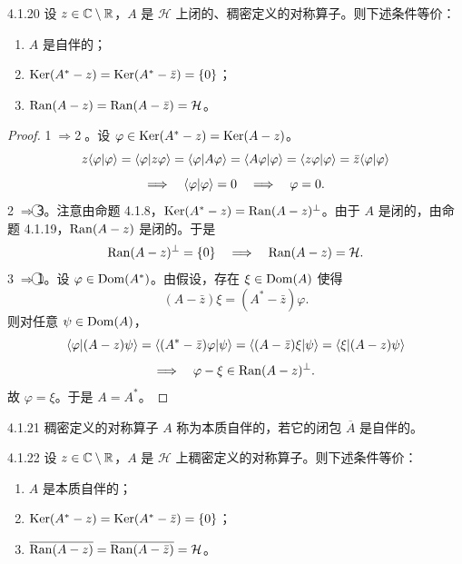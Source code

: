 \begin{proposition}{4.1.20}
  设 $z\in\mathbb{C}\setminus\mathbb{R}$，$A$ 是 $\mathcal{H}$ 上闭的、稠密定义的对称算子。则下述条件等价：
  \begin{enumerate}[label=\textcircled{\small\arabic*},leftmargin=2.6em,itemsep=2pt]
    \item $A$ 是自伴的；
    \item $\operatorname{Ker}(A^*-z)=\operatorname{Ker}(A^*-\bar z)=\{0\}$；
    \item $\operatorname{Ran}(A-z)=\operatorname{Ran}(A-\bar z)=\mathcal{H}$。
  \end{enumerate}
\end{proposition}

\begin{proof}
  \textcircled{\small 1}$\Longrightarrow$\textcircled{\small 2}。设 $\varphi\in\operatorname{Ker}(A^*-z)=\operatorname{Ker}(A-z)$。
  \[
  z\langle \varphi|\varphi\rangle=\langle \varphi|z\varphi\rangle=\langle \varphi|A\varphi\rangle
  =\langle A\varphi|\varphi\rangle=\langle z\varphi|\varphi\rangle=\bar z\langle \varphi|\varphi\rangle
  \]
  \[
  \Longrightarrow\quad\langle \varphi|\varphi\rangle=0
  \quad\Longrightarrow\quad\varphi=0.
  \]
  \textcircled{\small 2}$\Longrightarrow$\textcircled{\small 3}。注意由命题 4.1.8，$\operatorname{Ker}(A^*-z)=\operatorname{Ran}(A-z)^\perp$。由于 $A$ 是闭的，由命题 4.1.19，$\operatorname{Ran}(A-z)$ 是闭的。于是
  \[
  \operatorname{Ran}(A-z)^\perp=\{0\}\quad\Longrightarrow\quad\operatorname{Ran}(A-z)=\mathcal{H}.
  \]
  \textcircled{\small 3}$\Longrightarrow$\textcircled{\small 1}。设 $\varphi\in\operatorname{Dom}(A^*)$。由假设，存在 $\xi\in\operatorname{Dom}(A)$ 使得
  \[
  (A-\bar z)\xi=(A^*-\bar z)\varphi.
  \]
  则对任意 $\psi\in\operatorname{Dom}(A)$，
  \[
  \langle \varphi|(A-z)\psi\rangle=\langle (A^*-\bar z)\varphi|\psi\rangle
  =\langle (A-\bar z)\xi|\psi\rangle=\langle \xi|(A-z)\psi\rangle
  \]
  \[
  \Longrightarrow\quad\varphi-\xi\in\operatorname{Ran}(A-z)^\perp.
  \]
  故 $\varphi=\xi$。于是 $A=A^*$。
\end{proof}

\begin{definition}{4.1.21}
  稠密定义的对称算子 $A$ 称为本质自伴的，若它的闭包 $\overline{A}$ 是自伴的。
\end{definition}

\begin{proposition}{4.1.22}
  设 $z\in\mathbb{C}\setminus\mathbb{R}$，$A$ 是 $\mathcal{H}$ 上稠密定义的对称算子。则下述条件等价：
  \begin{enumerate}[label=\textcircled{\small\arabic*},leftmargin=2.6em,itemsep=2pt]
    \item $A$ 是本质自伴的；
    \item $\operatorname{Ker}(A^*-z)=\operatorname{Ker}(A^*-\bar z)=\{0\}$；
    \item $\overline{\operatorname{Ran}(A-z)}=\overline{\operatorname{Ran}(A-\bar z)}=\mathcal{H}$。
  \end{enumerate}
\end{proposition}

